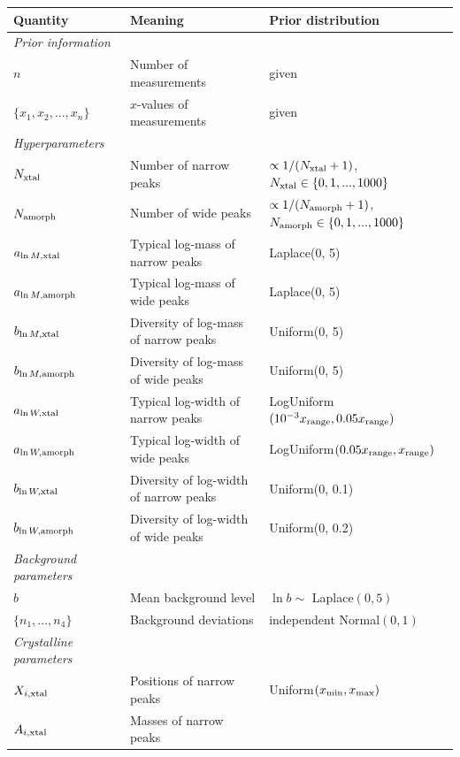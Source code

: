 \documentclass[review]{elsarticle}
\newcommand{\x}{x}
\begin{document}
\begin{landscape}

\begin{table}
\footnotesize
\centering
\begin{tabular}{|lll|}
\hline
{\bf Quantity}      &   {\bf Meaning}   &  {\bf Prior distribution}\\
\hline
{\em Prior information}&&\\
\hline
$n$ & Number of measurements & given\\
$\{\x_1, \x_2, ..., \x_n\}$  & $\x$-values of measurements & given \\
\hline
{\em Hyperparameters} & &\\
$N_{\rm xtal}$   &   Number of narrow peaks    &  $\propto 1/(N_{\rm xtal}+1)$, $N_{\rm xtal} \in \{0, 1, ..., 1000\}$ \\
$N_{\rm amorph}$   &   Number of wide peaks    &  $\propto 1/(N_{\rm amorph}+1)$,
$N_{\rm amorph} \in \{0, 1, ..., 1000\}$ \\
$a_{\ln M, \rm xtal}$ & Typical log-mass of narrow peaks & Laplace(0, 5)\\
$a_{\ln M, \rm amorph}$ & Typical log-mass of wide peaks & Laplace(0, 5)\\
$b_{\ln M, \rm xtal}$ & Diversity of log-mass of narrow peaks & Uniform(0, 5)\\
$b_{\ln M, \rm amorph}$ & Diversity of log-mass of wide peaks & Uniform(0, 5)\\
$a_{\ln W, \rm xtal}$ & Typical log-width of narrow peaks & LogUniform$(10^{-3}x_{\rm range}, 0.05x_{\rm range})$\\
$a_{\ln W, \rm amorph}$ & Typical log-width of wide peaks & LogUniform$(0.05x_{\rm range}, x_{\rm range})$\\
$b_{\ln W, \rm xtal}$ & Diversity of log-width of narrow peaks & Uniform(0, 0.1)\\
$b_{\ln W, \rm amorph}$ & Diversity of log-width of wide peaks & Uniform(0, 0.2)\\
\hline
{\em Background parameters}&&\\
$b$       & Mean background level       & $\ln b \sim $ Laplace$(0, 5)$\\
$\{n_1, ..., n_4\}$  & Background deviations & independent Normal$(0,1)$\\
\hline
{\em Crystalline parameters}&&\\
$X_{i, \rm xtal}$ & Positions of narrow peaks &
                            Uniform$(x_{\rm min}, x_{\rm max})$ \\
$A_{i, \rm xtal}$ & Masses of narrow peaks &

\end{tabular}
\end{table}
\end{landscape}
\end{document}
